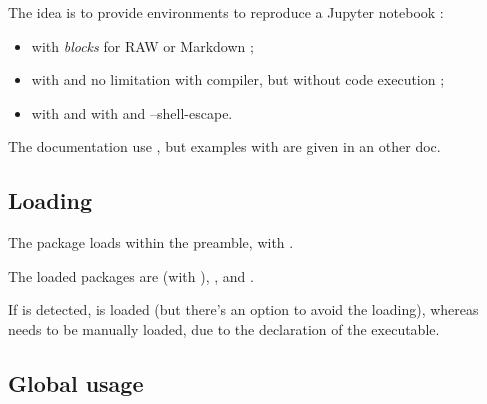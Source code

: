 \documentclass[english,11pt,a4paper]{article}
\begin{document}
The idea is to provide environments to reproduce a Jupyter notebook :

\begin{itemize}
	\item with \textit{blocks} for \textsf{RAW} or \textsf{Markdown} ;
	\item with  and no limitation with compiler, but without code execution ;
	\item with  and  with  and \textsf{--shell-escape}.
\end{itemize}

The documentation use , but examples with  are given in an other doc.

\subsection{Loading}

The package loads within the preamble, with .

The loaded packages are  (with ), ,  and .

If  is detected,  is loaded (but there's an option to avoid the loading), whereas  needs to be manually loaded, due to the declaration of the executable.

\begin{codehigh}[language=latex/latex2,style/main=cyan!10,style/code=cyan!10]
\usepackage{pynotebook}
\end{codehigh}

\begin{codehigh}[language=latex/latex2,style/main=cyan!10,style/code=cyan!10]
\usepackage{pynotebook}
\usepackage[options]{pyluatex}
\end{codehigh}

\begin{codehigh}[language=latex/latex2,style/main=cyan!10,style/code=cyan!10]
\usepackage[nopiton]{pynotebook}
\end{codehigh}

\subsection{Global usage}
\end{document}
